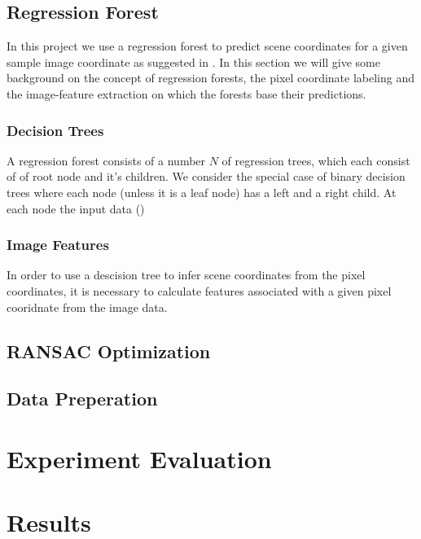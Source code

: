 \documentclass[final]{cvpr}
\begin{document}
\subsection{Regression Forest}

In this project we use a regression forest to predict scene coordinates for a given
sample image coordinate as suggested in \cite{shotton2013}. In this section we will
give some background on the concept of regression forests, the pixel coordinate
labeling and the image-feature extraction on which the forests base their predictions.\\

\subsubsection{Decision Trees}
A regression forest consists of a number $N$ of regression trees, which each consist of
of root node and it's children. We consider the special case of binary decision trees
where each node (unless it is a leaf node) has a left and a right child. At each node
the input data ()

\subsubsection{Image Features}
In order to use a descision tree to infer scene coordinates from the pixel coordinates,
it is necessary to calculate features associated with a given pixel cooridnate from the
image data. 


\subsection{RANSAC Optimization}

\subsection{Data Preperation}

\section{Experiment Evaluation}

\section{Results}


{\small


}
\end{document}
